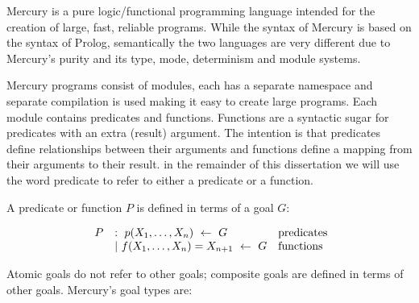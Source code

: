 

Mercury is a pure logic/functional programming language
intended for the creation of large, fast, reliable programs.
While the syntax of Mercury is based on the syntax of Prolog,
semantically the two languages are very different
due to Mercury's purity and its type, mode, determinism and module systems.

Mercury programs consist of modules,
each has a separate namespace and separate compilation is used making it easy
to create large programs.
Each module contains predicates and functions.
Functions are a syntactic sugar for predicates with an extra (result)
argument.
The intention is that
predicates define relationships between their arguments and
functions define a mapping from their arguments to their result.
in the remainder of this dissertation we will use the word predicate to refer to
either a predicate or a function.

A predicate or function $P$ is defined in terms of a goal $G$:

$$
\begin{array}{lll}
~P
    & :~ p(X_1, \ldots, X_n)~\leftarrow~G
        & \hbox{predicates} \\
    & |~ f(X_1, \ldots, X_n)=X_{n+1}~\leftarrow~G
        & \hbox{functions} \\
\end{array}
$$


\noindent
Atomic goals do not refer to other goals;
composite goals are defined in terms of other goals.
Mercury's goal types are:

